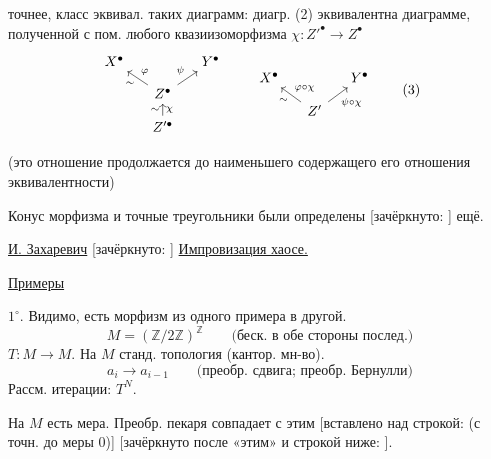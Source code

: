 точнее, класс эквивал. таких диаграмм: диагр. (2) эквивалентна
диаграмме, полученной с пом. любого квазиизоморфизма
$\chi:Z'^\bullet\to Z^\bullet$
\begin{equation*}
\begin{tikzcd}[column sep=small,row sep=small]
X^\bullet && Y^\bullet\\
& Z^\bullet \arrow[ul,"\varphi"',"\sim"] \arrow[ur,"\psi"] &\\
& Z'^\bullet \arrow[u,"\chi"',"\sim"] &
\end{tikzcd}
\qquad
\begin{tikzcd}[column sep=small,row sep=small]
X^\bullet && Y^\bullet\\
& Z' \arrow[ul,"{\varphi\circ\chi}"',"\sim"] \arrow[ur,"{\psi\circ\chi}"'] &
\end{tikzcd}
\tag{3}
\end{equation*}

(это отношение продолжается до наименьшего содержащего его
отношения эквивалентности)

Конус морфизма и точные треугольники были определены
[зачёркнуто: ]
ещё.


\underline{И. Захаревич}
[зачёркнуто: ]
\underline{Импровизация  хаосе.}

\underline{Примеры}

$1^{\circ}$. Видимо, есть морфизм из одного примера в другой.
\begin{equation*}
M=(\mathbb{Z}/2\mathbb{Z})^{\mathbb{Z}}
\qquad\text{(беск. в обе стороны послед.)}
\end{equation*}
$T\colon M\to M$. На $M$ станд. топология (кантор. мн-во).
\begin{equation*}
a_i\to a_{i-1}\qquad\text{(преобр. сдвига; преобр. Бернулли)}
\end{equation*}
Рассм. итерации: $T^N$.

На $M$ есть мера. Преобр. пекаря совпадает с этим
[вставлено над строкой: (с точн. до меры $0$)]
[зачёркнуто после «этим» и строкой ниже:
].

